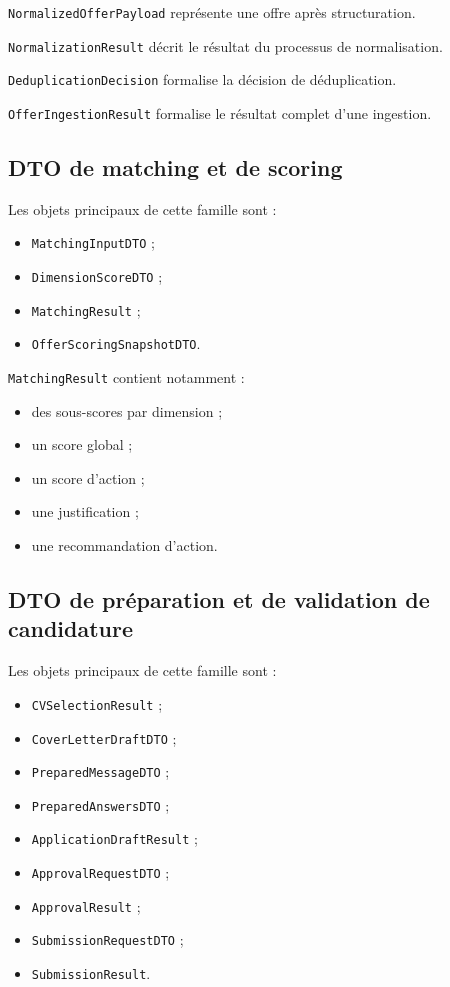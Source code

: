 \documentclass[11pt,a4paper]{article}
\begin{document}
\texttt{NormalizedOfferPayload} représente une offre après structuration.

\texttt{NormalizationResult} décrit le résultat du processus de normalisation.

\texttt{DeduplicationDecision} formalise la décision de déduplication.

\texttt{OfferIngestionResult} formalise le résultat complet d’une ingestion.

\subsection{DTO de matching et de scoring}

Les objets principaux de cette famille sont :

\begin{itemize}
    \item \texttt{MatchingInputDTO} ;
    \item \texttt{DimensionScoreDTO} ;
    \item \texttt{MatchingResult} ;
    \item \texttt{OfferScoringSnapshotDTO}.
\end{itemize}

\texttt{MatchingResult} contient notamment :

\begin{itemize}
    \item des sous-scores par dimension ;
    \item un score global ;
    \item un score d’action ;
    \item une justification ;
    \item une recommandation d’action.
\end{itemize}

\subsection{DTO de préparation et de validation de candidature}

Les objets principaux de cette famille sont :

\begin{itemize}
    \item \texttt{CVSelectionResult} ;
    \item \texttt{CoverLetterDraftDTO} ;
    \item \texttt{PreparedMessageDTO} ;
    \item \texttt{PreparedAnswersDTO} ;
    \item \texttt{ApplicationDraftResult} ;
    \item \texttt{ApprovalRequestDTO} ;
    \item \texttt{ApprovalResult} ;
    \item \texttt{SubmissionRequestDTO} ;
    \item \texttt{SubmissionResult}.
\end{itemize}
\end{document}
